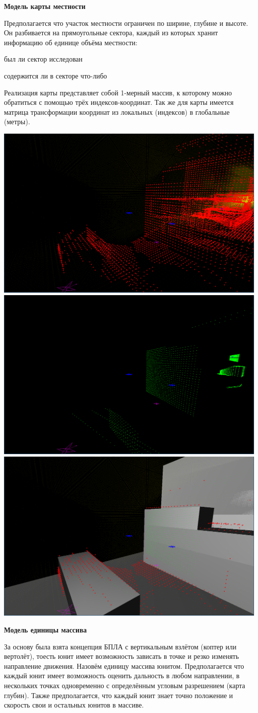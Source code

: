 \begin{slide}

    \makeatletter
    \let\@topfil\relax
    \makeatother

    \textbf{Модель карты местности}

    Предполагается что участок местности ограничен по ширине, глубине и высоте.
    Он разбивается на прямоугольные сектора, каждый из которых хранит информацию об единице объёма местности:
    \begin{mintemize}
        \item был ли сектор исследован
        \item содержится ли в секторе что-либо
    \end{mintemize}

    Реализация карты представляет собой 1-мерный массив, к которому можно обратиться с помощью трёх
    индексов-координат. Так же для карты имеется матрица трансформации координат из локальных (индексов)
    в глобальные (метры).

    \includegraphics[width=0.33\linewidth]{map1.png}
    \includegraphics[width=0.33\linewidth]{units_dots1.png}
    \includegraphics[width=0.33\linewidth]{all1.png}
\end{slide}

\begin{slide}

    \makeatletter
    \let\@topfil\relax
    \makeatother

    \textbf{Модель единицы массива}
    
    За основу была взята концепция БПЛА с вертикальным взлётом
    (коптер или вертолёт), тоесть юнит имеет возможность зависать в точке и резко изменять направление движения.
    Назовём единицу массива юнитом. Предполагается что каждый юнит имеет возможность
    оценить дальность в любом направлении, в нескольких точках одновременно с определённым 
    угловым разрешением (карта глубин). Также предполагается, что каждый юнит знает точно положение и скорость
    свои и остальных юнитов в массиве.

\end{slide}

